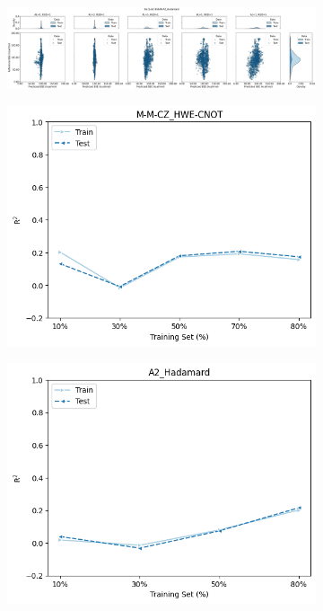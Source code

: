\documentclass[journal=jacsat,manuscript=article]{achemso}
\begin{document}
\begin{figure}[H]
	\hfill
	\begin{subfigure}[b]{\textwidth}
		\centering
		\includegraphics[width=\linewidth]{../images/BSE/sixteenqubit/distribution_parity}
		\caption{}
		\label{fig:BSE16_distribution_parity}
	\end{subfigure}
	\caption{}
	\label{fig:BSE_distribution_parity}	
\end{figure}



\begin{figure}[H]
	\centering	
	\begin{subfigure}[b]{0.49\textwidth}
		\centering
		\includegraphics[width=\linewidth]{../images/BSE/fivequbit/BSE_learningcurve}
		\caption{}
		\label{fig:BSE5_learning_curves}
	\end{subfigure}
	\hfill
	\begin{subfigure}[b]{0.49\textwidth}
		\centering
		\includegraphics[width=\linewidth]{../images/BSE/sixteenqubit/BSE_learningcurve}

\end{subfigure}
\end{figure}
\end{document}
